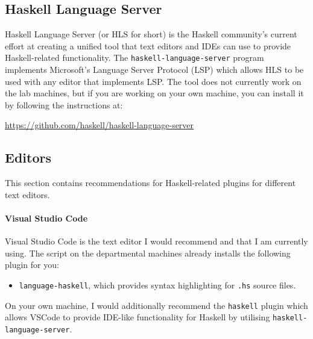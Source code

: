

\subsection{Haskell Language Server}

Haskell Language Server (or HLS for short) is the Haskell community's current effort at creating a unified tool that text editors and IDEs can use to provide Haskell-related functionality. The \texttt{\small haskell-language-server} program implements Microsoft's Language Server Protocol (LSP) which allows HLS to be used with any editor that implements LSP. The tool does not currently work on the lab machines, but if you are working on your own machine, you can install it by following the instructions at:
\begin{center}\small
	\url{https://github.com/haskell/haskell-language-server}
\end{center}

\subsection{Editors}
\label{sec:editors}

This section contains recommendations for Haskell-related plugins for different text editors.

\paragraph{Visual Studio Code} Visual Studio Code is the text editor I would recommend and that I am currently using. The  script on the departmental machines already installs the following plugin for you:
\begin{itemize}
	\item \texttt{\small language-haskell}, which provides syntax highlighting for \texttt{\small .hs} source files.
\end{itemize}
On your own machine, I would additionally recommend the \texttt{\small haskell} plugin which allows VSCode to provide IDE-like functionality for Haskell by utilising \texttt{\small haskell-language-server}. 

